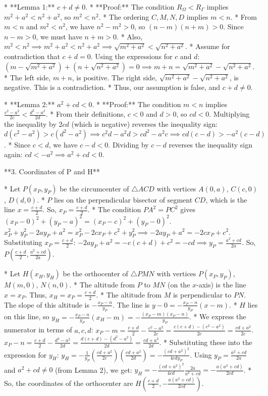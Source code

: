 *   **Lemma 1:** $c+d \neq 0$.
    *   **Proof:** The condition $R_\Omega < R_\Gamma$ implies $m^2+a^2 < n^2+a^2$, so $m^2 < n^2$.
    *   The ordering $C,M,N,D$ implies $m<n$.
    *   From $m<n$ and $m^2<n^2$, we have $n^2-m^2 > 0$, so $(n-m)(n+m)>0$. Since $n-m>0$, we must have $n+m>0$.
    *   Also, $m^2 < n^2 \implies m^2+a^2 < n^2+a^2 \implies \sqrt{m^2+a^2} < \sqrt{n^2+a^2}$.
    *   Assume for contradiction that $c+d=0$. Using the expressions for $c$ and $d$:
        $(m-\sqrt{m^2+a^2}) + (n+\sqrt{n^2+a^2}) = 0 \implies m+n = \sqrt{m^2+a^2} - \sqrt{n^2+a^2}$.
    *   The left side, $m+n$, is positive. The right side, $\sqrt{m^2+a^2} - \sqrt{n^2+a^2}$, is negative. This is a contradiction.
    *   Thus, our assumption is false, and $c+d \neq 0$.

*   **Lemma 2:** $a^2+cd < 0$.
    *   **Proof:** The condition $m<n$ implies $\frac{c^2-a^2}{2c} < \frac{d^2-a^2}{2d}$.
    *   From their definitions, $c<0$ and $d>0$, so $cd<0$. Multiplying the inequality by $2cd$ (which is negative) reverses the inequality sign:
        $d(c^2-a^2) > c(d^2-a^2) \implies c^2d-a^2d > cd^2-a^2c \implies cd(c-d) > -a^2(c-d)$.
    *   Since $c<d$, we have $c-d<0$. Dividing by $c-d$ reverses the inequality sign again:
        $cd < -a^2 \implies a^2+cd < 0$.

**3. Coordinates of P and H**

*   Let $P(x_P, y_P)$ be the circumcenter of $\triangle ACD$ with vertices $A(0,a)$, $C(c,0)$, $D(d,0)$.
*   $P$ lies on the perpendicular bisector of segment $CD$, which is the line $x = \frac{c+d}{2}$. So, $x_P = \frac{c+d}{2}$.
*   The condition $PA^2 = PC^2$ gives $(x_P-0)^2 + (y_P-a)^2 = (x_P-c)^2 + (y_P-0)^2$.
    $x_P^2 + y_P^2 - 2ay_P + a^2 = x_P^2 - 2cx_P + c^2 + y_P^2 \implies -2ay_P + a^2 = -2cx_P + c^2$.
    Substituting $x_P = \frac{c+d}{2}$: $-2ay_P + a^2 = -c(c+d) + c^2 = -cd \implies y_P = \frac{a^2+cd}{2a}$.
    So, $P\left(\frac{c+d}{2}, \frac{a^2+cd}{2a}\right)$.

*   Let $H(x_H, y_H)$ be the orthocenter of $\triangle PMN$ with vertices $P(x_P, y_P)$, $M(m,0)$, $N(n,0)$.
*   The altitude from $P$ to $MN$ (on the $x$-axis) is the line $x=x_P$. Thus, $x_H = x_P = \frac{c+d}{2}$.
*   The altitude from $M$ is perpendicular to $PN$. The slope of this altitude is $-\frac{x_P-n}{y_P}$. The line is $y-0 = -\frac{x_P-n}{y_P}(x-m)$.
*   $H$ lies on this line, so $y_H = -\frac{x_P-n}{y_P}(x_H-m) = -\frac{(x_P-m)(x_P-n)}{y_P}$.
*   We express the numerator in terms of $a,c,d$:
    $x_P-m = \frac{c+d}{2} - \frac{c^2-a^2}{2c} = \frac{c(c+d)-(c^2-a^2)}{2c} = \frac{cd+a^2}{2c}$.
    $x_P-n = \frac{c+d}{2} - \frac{d^2-a^2}{2d} = \frac{d(c+d)-(d^2-a^2)}{2d} = \frac{cd+a^2}{2d}$.
*   Substituting these into the expression for $y_H$:
    $y_H = -\frac{1}{y_P} \left(\frac{cd+a^2}{2c}\right) \left(\frac{cd+a^2}{2d}\right) = -\frac{(cd+a^2)^2}{4cd y_P}$.
    Using $y_P = \frac{a^2+cd}{2a}$ and $a^2+cd \neq 0$ (from Lemma 2), we get:
    $y_H = -\frac{(cd+a^2)^2}{4cd} \frac{2a}{a^2+cd} = -\frac{a(a^2+cd)}{2cd}$.
*   So, the coordinates of the orthocenter are $H\left(\frac{c+d}{2}, -\frac{a(a^2+cd)}{2cd}\right)$.

